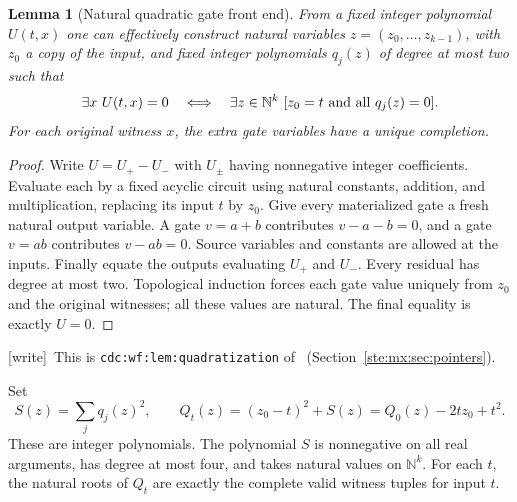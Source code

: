 \documentclass[11pt,letterpaper]{article}
\newtheorem{lemma}[theorem]{Lemma}
\theoremstyle{definition}
\theoremstyle{remark}
\newcommand{\N}{\mathbb N}
\newcommand{\wtag}{\textup{[write]}}
\begin{document}
\begin{lemma}[Natural quadratic gate front end]\label{ste:mx:lem:gate}
From a fixed integer polynomial $U(t,x)$ one can effectively construct natural
variables $z=(z_0,\ldots,z_{k-1})$, with $z_0$ a copy of the input, and fixed
integer polynomials $q_j(z)$ of degree at most two such that
\[
 \exists x\ U(t,x)=0
 \quad\Longleftrightarrow\quad
 \exists z\in\N^k\ [z_0=t\ \hbox{and all }q_j(z)=0].
\]
For each original witness $x$, the extra gate variables have a unique completion.
\end{lemma}
\begin{proof}
Write $U=U_+-U_-$ with $U_\pm$ having nonnegative integer coefficients.
Evaluate each by a fixed acyclic circuit using natural constants, addition,
and multiplication, replacing its input $t$ by $z_0$. Give every materialized
gate a fresh natural output variable. A gate $v=a+b$ contributes
$v-a-b=0$, and a gate $v=ab$ contributes $v-ab=0$. Source variables and
constants are allowed at the inputs. Finally equate the outputs evaluating
$U_+$ and $U_-$. Every residual has degree at most two. Topological induction
forces each gate value uniquely from $z_0$ and the original witnesses; all
these values are natural. The final equality is exactly $U=0$.
\end{proof}

\wtag\ This is \texttt{cdc:wf:lem:quadratization} of~\cite{cdc} (Section~\ref{ste:mx:sec:pointers}).


Set
\begin{equation}\label{ste:mx:eq:StQt}
 S(z)=\sum_j q_j(z)^2,\qquad
 Q_t(z)=(z_0-t)^2+S(z)=Q_0(z)-2tz_0+t^2.
\end{equation}
These are integer polynomials. The polynomial $S$ is nonnegative on all real
arguments, has degree at most four, and takes natural values on $\N^k$.
For each $t$, the natural roots of $Q_t$ are exactly the complete valid
witness tuples for input $t$.
\end{document}
